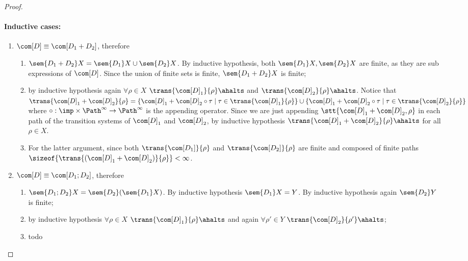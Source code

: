 \begin{proof}
  \paragraph*{Inductive cases:\\}
  \begin{enumerate}
  \item \(\com[D]\equiv \com[D_1 + D_2]\), therefore
    \begin{enumerate}[label=(\roman*).]
    \item \(\sem{D_1 + D_2} X = \sem{D_1}X \cup \sem{D_2}X\). By
      inductive hypothesis, both \(\sem{D_1}X, \sem{D_2}X\) are
      finite, as they are sub expressions of \(\com[D]\). Since the
      union of finite sets is finite, \(\sem{D_1 + D_2}X\) is finite;
    \item by inductive hypothesis again \(\forall \rho \in X\)
      \(\trans{\com[D]_1}{\rho}\ahalts\) and
      \(\trans{\com[D]_2}{\rho}\ahalts\). Notice that
      \(\trans{\com[D]_1 + \com[D]_2}{\rho} = \{\com[D]_1 + \com[D]_2
      \circ \tau \mid \tau \in \trans{\com[D]_1}{\rho} \}\cup \{
      \com[D]_1 + \com[D]_2 \circ \tau \mid \tau \in
      \trans{\com[D]_2}{\rho} \}\) where
      \(\circ : \imp \times \Path^\infty \to \Path^\infty\) is the
      appending operator. Since we are just appending
      \(\stt{\com[D]_1 + \com[D]_2, \rho}\) in each path of the
      transition systems of \(\com[D]_1\) and \(\com[D]_2\), by
      inductive hypothesis
      \(\trans{\com[D]_1 + \com[D]_2}{\rho} \ahalts\) for all
      \(\rho \in X\).
    \item For the latter argument, since both
      \(\trans{\com[D_1]}{\rho}\) and \(\trans{\com[D_2]}{\rho}\) are
      finite and composed of finite paths
      \(\sizeof{\trans{(\com[D]_1 + \com[D]_2)}{\rho}} < \infty\).
    \end{enumerate}
  \item \(\com[D]\equiv \com[D_1; D_2]\), therefore
    \begin{enumerate}[label=(\roman*).]
    \item \(\sem{D_1;D_2}X = \sem{D_2}(\sem{D_1}X)\). By inductive
      hypothesis \(\sem{D_1}X = Y\). By inductive hypothesis again
      \(\sem{D_2}Y\) is finite;
    \item by inductive hypothesis \(\forall \rho \in X\)
      \(\trans{\com[D]_1}{\rho}\ahalts\) and again
      \(\forall \rho' \in Y\) \(\trans{\com[D]_2}{\rho'}\ahalts\);
    \item todo
    \end{enumerate}
  \end{enumerate}
\end{proof}

